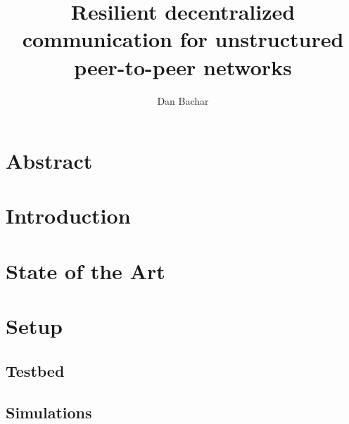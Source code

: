 \documentclass[sigconf,nonacm]{acmart}
\begin{document}
\title{Resilient decentralized communication for unstructured peer-to-peer networks}

\author{Dan Bachar}



\maketitle

\section*{Abstract}

\label{sec:abstract}

\section{Introduction}

\label{sec:introduction}

\section{State of the Art}

\label{sec:state}

\section{Setup}
\label{sec:setup}
\subsection{Testbed}

\label{subsec:testbed}

\subsection{Simulations}

\label{subsec:simulations}
\end{document}
